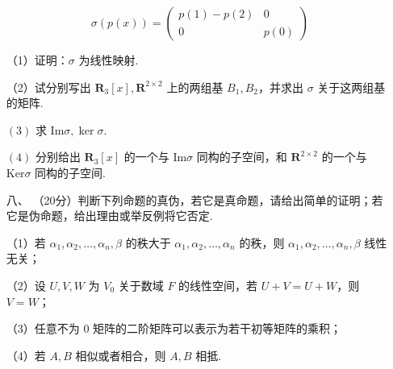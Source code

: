 \begin{enumerate}
	\[\sigma(p(x))=\begin{pmatrix}
	    p(1)-p(2)&0\\
	    0 & p(0)\end{pmatrix}\]

	（1）证明：$\sigma$ 为线性映射.

	（2）试分别写出 $\mathbf R_3[x],\mathbf R^{2\times 2}$ 上的两组基 $B_1,B_2$，并求出 $\sigma$ 关于这两组基的矩阵.

	$(3)$ 求 $\text{Im}\sigma,\ker\sigma$.

	$(4)$ 分别给出 $\mathbf R_3[x]$ 的一个与 $\text{Im}\sigma$ 同构的子空间，和 $\mathbf R^{2\times 2}$ 的一个与 $\text{Ker}\sigma$ 同构的子空间.
	\item[八、]（20分）判断下列命题的真伪，若它是真命题，请给出简单的证明；若它是伪命题，给出理由或举反例将它否定.

	（1）若 $\alpha_1,\alpha_2,\dots,\alpha_n,\beta$ 的秩大于 $\alpha_1,\alpha_2,\dots,\alpha_n$ 的秩，则 $\alpha_1,\alpha_2,\dots,\alpha_n,\beta$ 线性无关；

	（2）设 $U,V,W$ 为 $V_0$ 关于数域 $F$ 的线性空间，若 $U+V=U+W$，则 $V=W$；

	（3）任意不为 0 矩阵的二阶矩阵可以表示为若干初等矩阵的乘积；

	（4）若 $A,B$ 相似或者相合，则 $A,B$ 相抵.
\end{enumerate}

\clearpage

